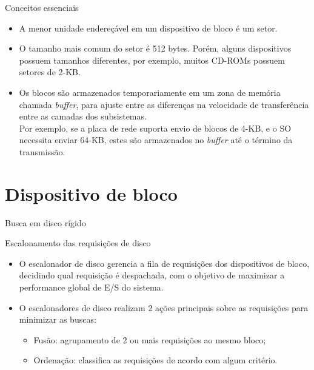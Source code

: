 \begin{frame}{\insertlecture}
  {Conceitos essenciais}
  
  \begin{itemize}
  \item A menor unidade endereçável em um dispositivo de bloco é um \alert{setor}.
  \item O tamanho mais comum do setor é \alert{512} bytes. Porém, alguns dispositivos
    possuem tamanhos diferentes, por exemplo, muitos CD-ROMs possuem setores de 2-KB.
  \item Os blocos são armazenados temporariamente em um zona de memória chamada 
    \alert{\em buffer}, para ajuste entre as diferenças na velocidade de transferência entre
    as camadas dos subsistemas. \\
    \smallskip
    {\small Por exemplo, se a placa de rede suporta envio de blocos 
      de 4-KB, e o SO necessita enviar 64-KB, estes são armazenados no {\em buffer} até
      o término da transmissão.}

  \end{itemize}
        
\end{frame}

\part{Dispositivo de bloco}
\frame{\partpage}


\begin{frame}{Busca em disco rígido}{}
  \begin{center}
    
  \end{center}
\end{frame}


\begin{frame}{Escalonamento das requisições de disco}
  
  \begin{itemize}
  \item O \alert{escalonador de disco} gerencia a fila de requisições
    dos dispositivos de bloco, decidindo qual requisição é despachada,
    com o objetivo de maximizar a performance global de E/S do
    sistema.
  \item O escalonadores de disco realizam 2 ações principais sobre as
    requisições para minimizar as buscas:
    \begin{itemize}
    \item \alert{Fusão}: agrupamento de 2 ou mais requisições ao mesmo bloco;
    \item \alert{Ordenação}: classifica as requisições de acordo com
      algum critério.
    \end{itemize}
  \end{itemize}
\end{frame}

